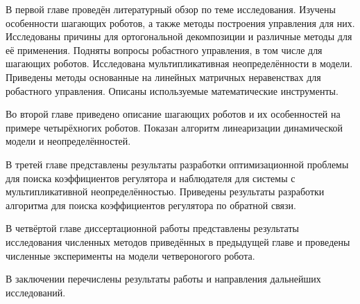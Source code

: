 В первой главе проведён литературный обзор по теме исследования. Изучены особенности шагающих роботов, а также методы построения управления для них. Исследованы причины для ортогональной декомпозиции и различные методы для её применения. Подняты вопросы робастного управления, в том числе для шагающих роботов. Исследована мультипликативная неопределённости в модели. Приведены методы основанные на линейных матричных неравенствах для робастного управления. Описаны используемые математические инструменты.

Во второй главе приведено описание шагающих роботов и их особенностей на примере четырёхногих роботов. Показан алгоритм линеаризации динамической модели и неопределённостей.

В третей главе представлены результаты разработки оптимизационной проблемы для поиска коэффициентов регулятора и наблюдателя для системы с мультипликативной неопределённостью. Приведены результаты разработки алгоритма для поиска коэффициентов регулятора по обратной связи.

В четвёртой главе диссертационной работы представлены результаты исследования численных методов приведённых в предыдущей главе и проведены численные эксперименты на модели четвероногого робота.

В заключении перечислены результаты работы и направления дальнейших исследований.